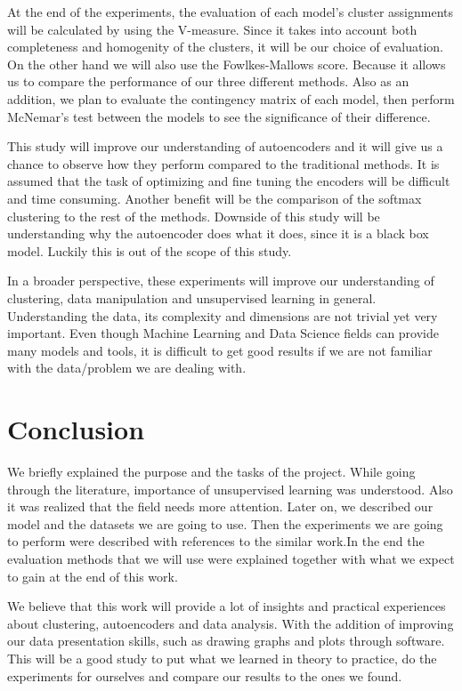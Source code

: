 \documentclass[journal]{IEEEtran}
\begin{document}
At the end of the experiments, the evaluation of each model's cluster assignments will be calculated by using the V-measure. Since it takes into account both completeness and homogenity of the clusters, it will be our choice of evaluation\cite{rosenberg2007v}. On the other hand we will also use the Fowlkes-Mallows score. Because it allows us to compare the performance of our three different methods\cite{fowlkes1983method}. Also as an addition, we plan to evaluate the contingency matrix of each model, then perform McNemar's test between the models to see the significance of their difference.\par

This study will improve our understanding of autoencoders and it will give us a chance to observe how they perform compared to the traditional methods. It is assumed that the task of optimizing and fine tuning the encoders will be difficult and time consuming. Another benefit will be the comparison of the softmax clustering to the rest of the methods. Downside of this study will be understanding why the autoencoder does what it does, since it is a black box model. Luckily this is out of the scope of this study. 

In a broader perspective, these experiments will improve our understanding of clustering, data manipulation and unsupervised learning in general. Understanding the data, its complexity and dimensions are not trivial yet very important. Even though Machine Learning and Data Science fields can provide many models and tools, it is difficult to get good results if we are not familiar with the data/problem we are dealing with.\par

\section{Conclusion}

We briefly explained the purpose and the tasks of the project. While going through the literature, importance of unsupervised learning was understood. Also it was realized that the field needs more attention. Later on, we described our model and the datasets we are going to use. Then the experiments we are going to perform were described with references to the similar work.In the end the evaluation methods that we will use were explained together with what we expect to gain at the end of this work.\par

We believe that this work will provide a lot of insights and practical experiences about clustering, autoencoders and data analysis. With the addition of improving our data presentation skills, such as drawing graphs and plots through software. This will be a good study to put what we learned in theory to practice, do the experiments for ourselves and compare our results to the ones we found. 
\newpage
\end{document}

